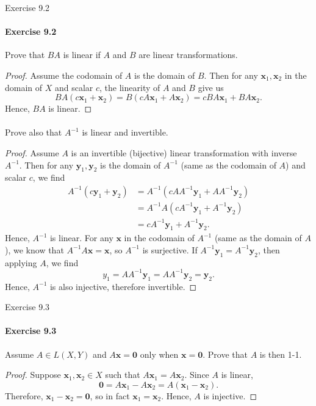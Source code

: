 \documentclass[12pt]{article}
\newenvironment{fullbox}{\begin{lrbox}{\savefullbox}\begin{minipage}{\dimexpr\textwidth-2\fboxsep\relax}}{\end{minipage}\end{lrbox}\begin{center}\framebox[\textwidth]{\usebox{\savefullbox}}\end{center}}
\newenvironment{pbox}[1][]{\begin{fullbox}\ifx#1\empty\else\paragraph{#1}\fi}{\end{fullbox}}
\theoremstyle{definition}
\newcommand{\bm}{\mathbf}
\newcommand{\x}{\mathbf{x}}
\newcommand{\y}{\mathbf{y}}
\begin{document}
\thispagestyle{title}


\begin{pbox}[Exercise 9.2]
    Prove that $BA$ is linear if $A$ and $B$ are linear transformations.
\end{pbox}

\begin{proof}
    Assume the codomain of $A$ is the domain of $B$. Then for any $\x_1, \x_2$ in the domain of $X$ and scalar $c$, the linearity of $A$ and $B$ give us
    \[
        BA(c\x_1 + \x_2) = B(cA\x_1 + A\x_2) = cBA\x_1 + BA\x_2.
    \]
    Hence, $BA$ is linear.
\end{proof}

\begin{pbox}[]
    Prove also that $A^{-1}$ is linear and invertible.
\end{pbox}

\begin{proof}
    Assume $A$ is an invertible (bijective) linear transformation with inverse $A^{-1}$. Then for any $\y_1, \y_2$ is the domain of $A^{-1}$ (same as the codomain of $A$) and scalar $c$, we find
    \begin{align*}
        A^{-1}(c\y_1 + \y_2)
            &= A^{-1}(cAA^{-1}\y_1 + AA^{-1}\y_2) \\
            &= A^{-1}A(cA^{-1}\y_1 + A^{-1}\y_2) \\
            &= cA^{-1}\y_1 + A^{-1}\y_2.
    \end{align*}
    Hence, $A^{-1}$ is linear. For any $\x$ in the codomain of $A^{-1}$ (same as the domain of $A$), we know that $A^{-1}A\x = \x$, so $A^{-1}$ is surjective. If $A^{-1}\y_1 = A^{-1}\y_2$, then applying $A$, we find
    \[
        y_1 = AA^{-1}\y_1 = AA^{-1}\y_2 = \y_2.
    \]
    Hence, $A^{-1}$ is also injective, therefore invertible. 

\end{proof}




\begin{pbox}[Exercise 9.3]
    Assume $A \in L(X, Y)$ and $A\x = \bm{0}$ only when $\x = \bm{0}$. Prove that $A$ is then 1-1.
\end{pbox}

\begin{proof}
    Suppose $\x_1, \x_2 \in X$ such that $A\x_1 = A\x_2$. Since $A$ is linear,
    \[
        \bm{0} = A\x_1 - A\x_2 = A(\x_1 - \x_2).
    \]
    Therefore, $\x_1 - \x_2 = \bm{0}$, so in fact $\x_1 = \x_2$. Hence, $A$ is injective.

\end{proof}
\end{document}
